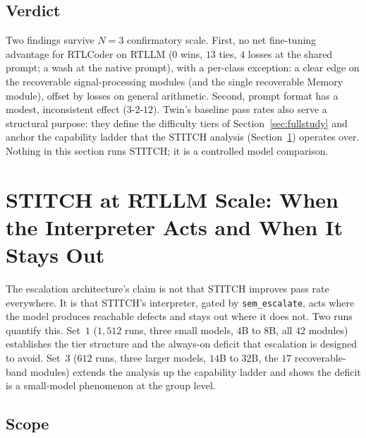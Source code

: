 \documentclass[11pt]{article}
\begin{document}
\subsection{Verdict}
\label{sec:twin-verdict}

Two findings survive $N{=}3$ confirmatory scale. First, no net fine-tuning
advantage for RTLCoder on RTLLM ($0$ wins, $13$ ties, $4$ losses at the shared
prompt; a wash at the native prompt), with a per-class exception: a clear edge
on the recoverable signal-processing modules (and the single recoverable Memory
module), offset by losses on general arithmetic. Second, prompt format has a
modest, inconsistent effect ($3$-$2$-$12$). Twin's baseline pass rates also
serve a structural purpose: they define the difficulty tiers of
Section~\ref{sec:fullstudy} and anchor the capability ladder that the STITCH
analysis (Section~\ref{sec:stitch-rtllm}) operates over. Nothing in this
section runs STITCH; it is a controlled model comparison.

\section{STITCH at RTLLM Scale: When the Interpreter Acts and When It Stays Out}
\label{sec:stitch-rtllm}

The escalation architecture's claim is not that STITCH improves pass rate
everywhere. It is that STITCH's interpreter, gated by \texttt{sem\_escalate},
acts where the model produces reachable defects and stays out where it does
not. Two runs quantify this. Set~$1$ ($1{,}512$ runs, three small models,
$4$B to $8$B, all $42$ modules) establishes the tier structure and the
always-on deficit that escalation is designed to avoid. Set~$3$ ($612$ runs,
three larger models, $14$B to $32$B, the $17$ recoverable-band modules)
extends the analysis up the capability ladder and shows the deficit is a
small-model phenomenon at the group level.

\subsection{Scope}
\label{sec:stitch-rtllm-scope}
\end{document}
